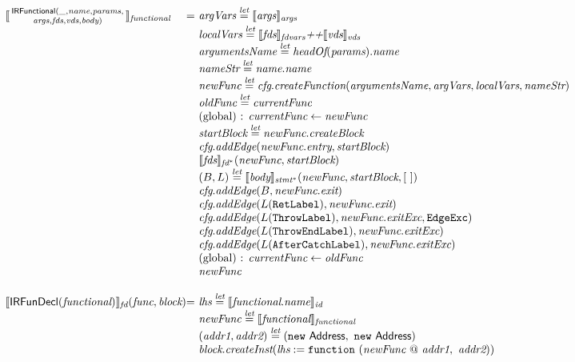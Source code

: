 \[\begin{array}{l@{}l@{~}l}
\transfun{\irfunctionalsmall{\_}{\emph{name}}{\emph{params}}{\emph{args}}{\emph{fds}}{\emph{vds}}{\emph{body}}}_{\emph{functional}}
& = & \emph{argVars} \letval \transfun{\emph{args}}_{\emph{args}}\\
& & \emph{localVars} \letval \transfun{\emph{fds}}_{\emph{fdvars}} \emph{++} \transfun{\emph{vds}}_{\emph{vds}}\\
& & \emph{argumentsName} \letval \headOf(\emph{params}).\emph{name}\\
& & \emph{nameStr} \letval \emph{name}.\emph{name}\\
& & \emph{newFunc} \letval \emph{cfg}.\emph{createFunction}(\emph{argumentsName}, \emph{argVars}, \emph{localVars}, \emph{nameStr})\\
& & \emph{oldFunc} \letval \emph{currentFunc}\\
& & \text{(global) : } \emph{currentFunc} \leftarrow \emph{newFunc}\\
& & \emph{startBlock} \letval \emph{newFunc}.\emph{createBlock}\\
& & \emph{cfg}.\emph{addEdge}(\emph{newFunc}.\emph{entry}, \emph{startBlock})\\
& & \transfun{\emph{fds}}_{\emph{fd}^{*}}(\emph{newFunc}, \emph{startBlock})\\
& & (B, L) \letval \transfun{\emph{body}}_{\emph{stmt}^{*}}(\emph{newFunc}, \emph{startBlock}, [\ ])\\
& & \emph{cfg}.\emph{addEdge}(B, \emph{newFunc}.\emph{exit})\\
& & \emph{cfg}.\emph{addEdge}(L(\TT{RetLabel}), \emph{newFunc}.\emph{exit})\\
& & \emph{cfg}.\emph{addEdge}(L(\TT{ThrowLabel}), \emph{newFunc}.\emph{exitExc}, \EdgeExc)\\
& & \emph{cfg}.\emph{addEdge}(L(\TT{ThrowEndLabel}), \emph{newFunc}.\emph{exitExc})\\
& & \emph{cfg}.\emph{addEdge}(L(\TT{AfterCatchLabel}), \emph{newFunc}.\emph{exitExc})\\
& & \text{(global) : } \emph{currentFunc} \leftarrow \emph{oldFunc}\\
& & \emph{newFunc}\\
& & \\

\transfun{\IRFunDecl(\emph{functional})}_{\emph{fd}}(\emph{func}, \emph{block})
& = & \emph{lhs} \letval \transfun{\emph{functional}.\emph{name}}_{\emph{id}}\\
& & \emph{newFunc} \letval \transfun{\emph{functional}}_{\emph{functional}}\\
& & (\emph{addr1}, \emph{addr2}) \letval (\new\ \Address,\ \new\ \Address)\\
& & \emph{block}.\emph{createInst}(\emph{lhs} := \TT{function}\ (\emph{newFunc} ~@~ \emph{addr1},\ \emph{addr2}))\\
& & \\


\end{array}\]
